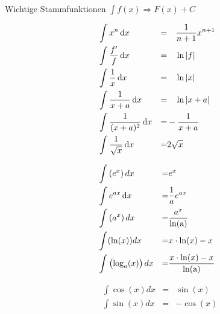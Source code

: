     \begin{highlight}{Wichtige Stammfunktionen}
        $\int f(x) \Longrightarrow F(x) + C$
    \begin{center}
        \begin{minipage}{0.45\linewidth}
            \begin{align*}
                &\int x^n \dif x  &=&  \quad \frac{1}{n+1}x^{n+1}  \\
                &\int \frac{f'}{f} \dif x  &=&  \quad \ln \left\lvert f \right\rvert  \\
                &\int \frac{1}{x} \dif x  &=& \quad \ln \left\lvert x \right\rvert  \\
                &\int \frac{1}{x+a} \dif x  &=&  \quad \ln \left\lvert x+a \right\rvert \\
                &\int \frac{1}{(x+a)^2} \dif x  &=&  -\frac{1}{x+a}  \\
                &\int \frac{1}{\sqrt{x}}\dif x  &=&  2 \sqrt{x}  \\
            \end{align*}
        \end{minipage}
        \hfill\vline\hfill
        \begin{minipage}{0.45\linewidth}
            \begin{align*}
                &\int\left(e^{x}\right) d x  &=& e^{x} \\
                &\int e^{ax} \dif x  &=&  \frac{1}{a} e^{ax}  \\
                &\int\left(a^{x}\right) d x \quad  &=& \frac{a^{x}}{\ln (\mathrm{a})} \\
                &\int(\ln (x)) d x  &=& x \cdot \ln (x)-x \\
                &\int\left(\log _{a}(x)\right) d x  &=& \frac{x \cdot \ln (x)-x}{\ln (\mathrm{a})} \\
            \end{align*}
        \end{minipage}
    \end{center}
    \begin{center}
        \begin{minipage}{0.4\linewidth}
                \begin{align*}
                    &\int\cos (x) d x  &=& \sin (x) \\
                    &\int\sin (x) d x  &=& -\cos (x) \\

\end{align*}
\end{minipage}
\end{center}
\end{highlight}
